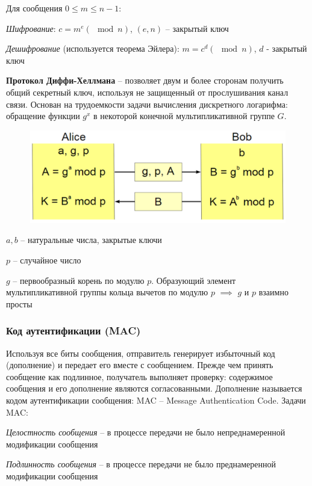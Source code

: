 Для сообщения $0 \leq m \leq n - 1$:

\textit{Шифрование}: $c = m^e(\mod n)$, $(e, n)$ -- закрытый ключ

\textit{Дешифрование} (используется теорема Эйлера): $m = c^d(\mod n)$, $d$ - закрытый ключ

\textbf{Протокол Диффи-Хеллмана} -- позволяет двум и более сторонам получить общий секретный ключ, используя не защищенный от прослушивания канал связи. Основан на трудоемкости задачи вычисления дискретного логарифма: обращение функции $g^x$ в некоторой конечной мультипликативной группе $G$.

\begin{figure}
\includegraphics[width=\linewidth]{pics/diffi-hellman.png}
\end{figure}

\textbf{$a, b$} -- натуральные числа, закрытые ключи

\textbf{$p$} -- случайное число

\textbf{$g$} -- первообразный корень по модулю $p$. Образующий элемент мультипликативной группы кольца вычетов по модулю $p$ $\implies$ $g$ и $p$ взаимно просты

\subsubsection{Код аутентификации (MAC)}

Используя все биты сообщения, отправитель генерирует избыточный код (дополнение) и передает его вместе с сообщением.
Прежде чем принять сообщение как подлинное, получатель выполняет проверку: содержимое сообщения и его дополнение являются согласованными.
Дополнение называется кодом аутентификации сообщения: MAC – Message Authentication Code. Задачи MAC:

\textit{Целостность сообщения} -- в процессе передачи не было непреднамеренной модификации сообщения

\textit{Подлинность сообщения} -- в процессе передачи не было преднамеренной модификации сообщения

